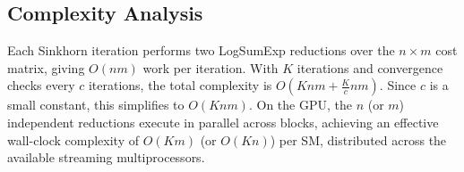 \subsection{Complexity Analysis}

Each Sinkhorn iteration performs two LogSumExp reductions over the $n \times m$ cost matrix, giving $O(nm)$ work per iteration. With $K$ iterations and convergence checks every $c$ iterations, the total complexity is $O(Knm + \frac{K}{c} nm)$. Since $c$ is a small constant, this simplifies to $O(Knm)$. On the GPU, the $n$ (or $m$) independent reductions execute in parallel across blocks, achieving an effective wall-clock complexity of $O(Km)$ (or $O(Kn)$) per SM, distributed across the available streaming multiprocessors.
